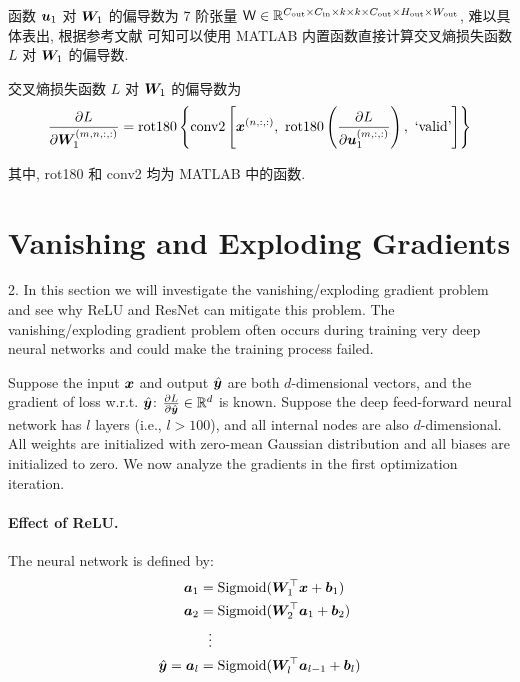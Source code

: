 \documentclass{article}
\begin{document}
函数 $\bm{u}_1$ 对 $\bm{W}_1$ 的偏导数为 7 阶张量 $\mathsf{W}\in\mathbb{R}^{C_{\text{out}}\times C_{\text{in}}\times k\times k\times C_{\text{out}}\times H_{\text{out}}\times W_{\text{out}}}$, 难以具体表出, 根据参考文献 \cite{notecnn} 可知可以使用 MATLAB 内置函数直接计算交叉熵损失函数 $L$ 对 $\bm{W}_1$ 的偏导数.

交叉熵损失函数 $L$ 对 $\bm{W}_1$ 的偏导数为
\begin{equation}
  \frac{\partial L}{\partial\bm{W}_1^{(m,n,:,:)}}
  =\mathrm{rot180}\left\{\mathrm{conv2}\left[\bm{x}^{(n,:,:)},~\mathrm{rot180}\left(\frac{\partial L}{\partial\bm{u}_1^{(m,:,:)}}\right),~\text{`valid'}\right]\right\}
\end{equation}

其中, rot180 和 conv2 均为 MATLAB 中的函数.

\section*{Vanishing and Exploding Gradients}

2. In this section we will investigate the vanishing/exploding gradient problem and see why ReLU and ResNet can mitigate this problem. The vanishing/exploding gradient problem often occurs during training very deep neural networks and could make the training process failed.

Suppose the input $\bm{x}$ and output $\hat{\bm{y}}$ are both $d$-dimensional vectors, and the gradient of loss w.r.t. $\hat{\bm{y}}$: $\frac{\partial L}{\partial \hat{\bm{y}}}\in\mathbb R^d$ is known. Suppose the deep feed-forward neural network has $l$ layers (i.e., $l>100$), and all internal nodes are also $d$-dimensional. All weights are initialized with zero-mean Gaussian distribution and all biases are initialized to zero. We now analyze the gradients in the first optimization iteration.

\paragraph{Effect of ReLU.} The neural network is defined by: 
\begin{equation}
  \begin{aligned}
    \bm{a}_1&=\mathrm{Sigmoid}(\bm{W}_1^\top\bm{x}+\bm{b}_1)\\
    \bm{a}_2&=\mathrm{Sigmoid}(\bm{W}_2^\top\bm{a}_1+\bm{b}_2)\\
    &~~\vdots\\
    \hat{\bm{y}}=\bm{a}_l&=\mathrm{Sigmoid}(\bm{W}_l^\top\bm{a}_{l-1}+\bm{b}_l)
  \end{aligned}
\end{equation}
\end{document}
